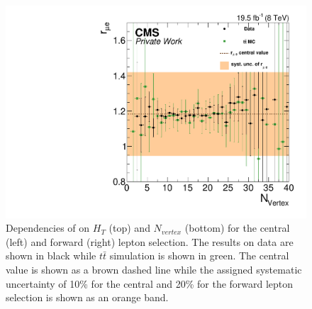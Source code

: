 \begin{figure}[htbp]
\begin{minipage}[t]{0.49\textwidth}
\end{minipage}
\begin{minipage}[t]{0.49\textwidth}
\includegraphics[width=\textwidth]{plots/BG/rmue/rMuE_ZPeakControlForward_Full2012_nVtx_None.pdf}
\end{minipage}
\caption{Dependencies of \rmue on $H_T$ (top) and $N_{vertex}$ (bottom) for the central (left) and forward (right) lepton selection. The results on data are shown in black while $t\bar{t}$ simulation is shown in green. The central value is shown as a brown dashed line while the assigned systematic uncertainty of 10\% for the central and 20\% for the forward lepton selection is shown as an orange band.}
\label{fig:rmueDependenciesApp3}
\end{figure} 

